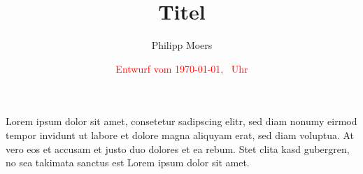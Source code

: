 \documentclass
[
    a4paper,
    fontsize=11pt, %
    parskip=half,  %
    titlepage=false %
]
{scrartcl}
\date{\textcolor{red}{Entwurf vom \today, \thistime~Uhr}}
\author{Philipp Moers}
\title{Titel}
\begin{document}
\maketitle

Lorem ipsum dolor sit amet, consetetur sadipscing elitr, sed diam nonumy eirmod tempor invidunt ut labore et dolore magna aliquyam erat, sed diam voluptua. At vero eos et accusam et justo duo dolores et ea rebum. Stet clita kasd gubergren, no sea takimata sanctus est Lorem ipsum dolor sit amet.
\end{document}
